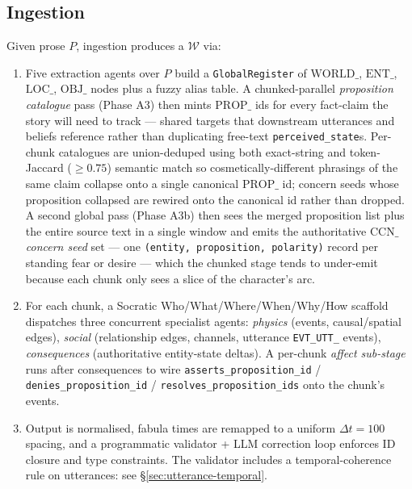 \documentclass[11pt]{article}
\begin{document}
\subsection{Ingestion}
\label{app:ingestion}

Given prose $P$, ingestion produces a $\mathcal{W}$ via:
\begin{enumerate}
\item Five extraction agents over $P$ build a
      \texttt{GlobalRegister} of $\mathrm{WORLD}\_$, $\mathrm{ENT}\_$,
      $\mathrm{LOC}\_$, $\mathrm{OBJ}\_$ nodes plus a fuzzy alias
      table. A chunked-parallel \emph{proposition catalogue} pass
      (Phase A3) then mints $\mathrm{PROP}\_$ ids for every
      fact-claim the story will need to track --- shared targets
      that downstream utterances and beliefs reference rather
      than duplicating free-text \texttt{perceived\_state}s.
      Per-chunk catalogues are union-deduped using both exact-string
      and token-Jaccard ($\geq 0.75$) semantic match so
      cosmetically-different phrasings of the same claim collapse
      onto a single canonical $\mathrm{PROP}\_$ id; concern seeds
      whose proposition collapsed are rewired onto the canonical
      id rather than dropped. A second global pass (Phase A3b)
      then sees the merged proposition list plus the entire
      source text in a single window and emits the authoritative
      $\mathrm{CCN}\_$ \emph{concern seed} set --- one
      \texttt{(entity, proposition, polarity)} record per standing
      fear or desire --- which the chunked stage tends to
      under-emit because each chunk only sees a slice of the
      character's arc.
\item For each chunk, a Socratic Who/What/Where/When/Why/How
      scaffold dispatches three concurrent specialist agents:
      \emph{physics} (events, causal/spatial edges), \emph{social}
      (relationship edges, channels, utterance \texttt{EVT\_UTT\_}
      events), \emph{consequences} (authoritative entity-state
      deltas). A per-chunk \emph{affect sub-stage} runs after
      consequences to wire \texttt{asserts\_proposition\_id} /
      \texttt{denies\_proposition\_id} / \texttt{resolves\_proposition\_ids}
      onto the chunk's events.
\item Output is normalised, fabula times are remapped to a
      uniform $\Delta t = 100$ spacing, and a programmatic
      validator + LLM correction loop enforces ID closure and
      type constraints. The validator includes a temporal-coherence
      rule on utterances: see \S\ref{sec:utterance-temporal}.

\end{enumerate}
\end{document}

